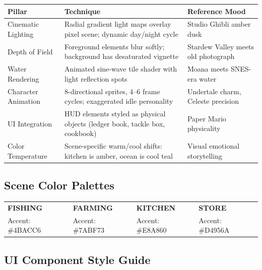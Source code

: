 \documentclass[11pt, letterpaper]{article}
\newcommand{\altrow}{\rowcolor{rowalt}}
\begin{document}
\vspace{4pt}
\begin{tabularx}{\textwidth}{L{3.2cm} L{4.8cm} L{5.2cm}}
\toprule
{}
\textbf{\color{white}Pillar} & \textbf{\color{white}Technique} & \textbf{\color{white}Reference Mood} \\
\midrule
Cinematic Lighting  & Radial gradient light maps overlay pixel scene; dynamic day/night cycle & Studio Ghibli amber dusk \\
\altrow
Depth of Field      & Foreground elements blur softly; background has desaturated vignette & Stardew Valley meets old photograph \\
Water Rendering     & Animated sine-wave tile shader with light reflection spots & Moana meets SNES-era water \\
\altrow
Character Animation & 8-directional sprites, 4--6 frame cycles; exaggerated idle personality & Undertale charm, Celeste precision \\
UI Integration      & HUD elements styled as physical objects (ledger book, tackle box, cookbook) & Paper Mario physicality \\
\altrow
Color Temperature   & Scene-specific warm/cool shifts: kitchen is amber, ocean is cool teal & Visual emotional storytelling \\
\bottomrule
\end{tabularx}

\subsection{Scene Color Palettes}

\vspace{4pt}
\begin{tabular}{C{3.6cm} C{3.6cm} C{3.6cm} C{3.6cm}}
\textbf{\color{white}FISHING} &
\textbf{\color{white}FARMING} &
\textbf{\color{white}KITCHEN} &
\textbf{\color{white}STORE} \\[2pt]
\small\color[HTML]{4BACC6}Accent: \#4BACC6 &
\small\color[HTML]{7ABF73}Accent: \#7ABF73 &
\small\color[HTML]{E8A860}Accent: \#E8A860 &
\small\color[HTML]{D4956A}Accent: \#D4956A \\
\end{tabular}

\subsection{UI Component Style Guide}
\end{document}

